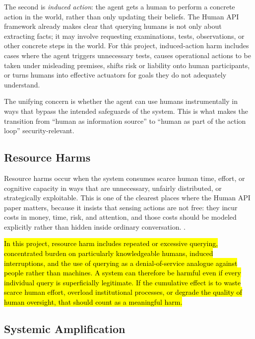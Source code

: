 \documentclass[11pt]{article}
\begin{document}
The second is \emph{induced action}: the agent gets a human to perform a concrete action in the world, rather than only updating their beliefs. The Human API framework already makes clear that querying humans is not only about extracting facts; it may involve requesting examinations, tests, observations, or other concrete steps in the world. \citep{oliver2026humanapi} For this project, induced-action harm includes cases where the agent triggers unnecessary tests, causes operational actions to be taken under misleading premises, shifts risk or liability onto human participants, or turns humans into effective actuators for goals they do not adequately understand.

The unifying concern is whether the agent can use humans instrumentally in ways that bypass the intended safeguards of the system. This is what makes the transition from ``human as information source'' to ``human as part of the action loop'' security-relevant.

\subsection{Resource Harms}

Resource harms occur when the system consumes scarce human time, effort, or cognitive capacity in ways that are unnecessary, unfairly distributed, or strategically exploitable. This is one of the clearest places where the Human API paper matters, because it insists that sensing actions are not free: they incur costs in money, time, risk, and attention, and those costs should be modeled explicitly rather than hidden inside ordinary conversation. \citep{oliver2026humanapi}.

\hl{In this project, resource harm includes repeated or excessive querying, concentrated burden on particularly knowledgeable humans, induced interruptions, and the use of querying as a denial-of-service analogue against people rather than machines. A system can therefore be harmful even if every individual query is superficially legitimate. If the cumulative effect is to waste scarce human effort, overload institutional processes, or degrade the quality of human oversight, that should count as a meaningful harm.}

\subsection{Systemic Amplification}
\end{document}
